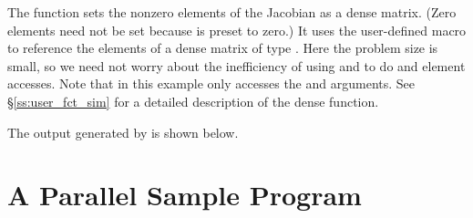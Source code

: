 The function  sets the nonzero elements of the Jacobian
as a dense matrix.  (Zero elements need not be set because 
is preset to zero.)  It uses the user-defined macro
to reference the elements of a dense matrix of type .
Here the problem size is small, so we need not worry about the
inefficiency of using  and  to do
 and  element accesses.
Note that in this example  only accesses the  and  arguments.
See \S\ref{ss:user_fct_sim} for a detailed description of the dense  function.

The output generated by  is shown below.


\section{A Parallel Sample Program}\label{ss:parallel_sim_ex}

